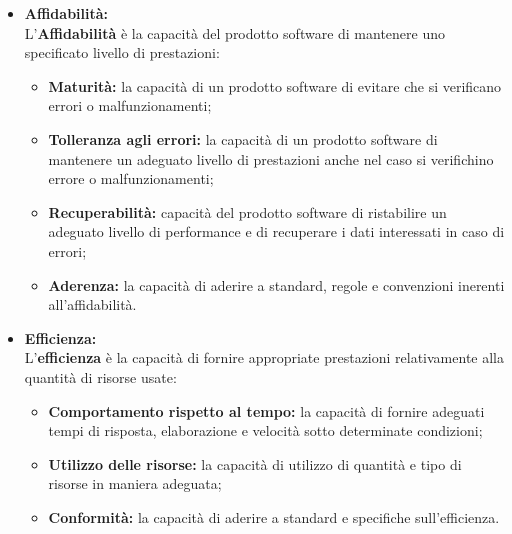 \begin{flushleft}
\begin{itemize}
\item \textbf{Affidabilità:}\\
L'\textbf{Affidabilità} è la capacità del prodotto software di mantenere uno specificato livello di prestazioni:
\begin{itemize}
	\item \textbf{Maturità:} la capacità di un prodotto software di evitare che si verificano errori o malfunzionamenti;
	\item \textbf{Tolleranza agli errori:} la capacità di un prodotto software di mantenere un adeguato livello di prestazioni anche nel caso si verifichino errore o malfunzionamenti;
	\item \textbf{Recuperabilità:} capacità del prodotto software di ristabilire un adeguato livello di performance e di recuperare i dati interessati in caso di errori;
	\item \textbf{Aderenza:} la capacità di aderire a standard, regole e convenzioni inerenti all'affidabilità.
\end{itemize}

\item \textbf{Efficienza:}\\
L'\textbf{efficienza} è la capacità di fornire appropriate prestazioni relativamente alla quantità di risorse usate:
\begin{itemize}
	\item \textbf{Comportamento rispetto al tempo:} la capacità di fornire adeguati tempi di risposta, elaborazione e velocità sotto determinate condizioni;
	\item \textbf{Utilizzo delle risorse:} la capacità di utilizzo di quantità e tipo di risorse in maniera adeguata;
	\item \textbf{Conformità:} la capacità di aderire a standard e specifiche sull'efficienza.
\end{itemize}


\end{itemize}
\end{flushleft}
